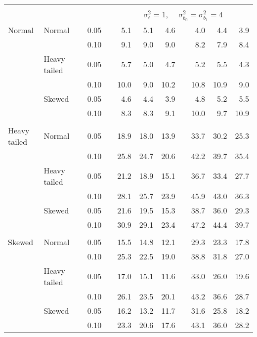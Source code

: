 \begin{table}[ht]
\begin{scriptsize}
\begin{tabular}{ll p{.1cm} c p{.1cm} rrr p{.1cm} rrr}
&&&&&&&&&&&\\
& && && \multicolumn{7}{c}{$\sigma_{\varepsilon}^2 = 1$, \ \ $\sigma_{b_0}^2 = \sigma_{b_1}^2 = 4$} \\ \cline{6-12}
\rowcolor{gray!20} Normal & Normal &  & 0.05 &  & 5.1 & 5.1 & 4.6 &  & 4.0 & 4.4 & 3.9 \\ 
\rowcolor{gray!20}    &  &  & 0.10 &  & 9.1 & 9.0 & 9.0 &  & 8.2 & 7.9 & 8.4 \\ 
\rowcolor{gray!20}    & Heavy tailed &  & 0.05 &  & 5.7 & 5.0 & 4.7 &  & 5.2 & 5.5 & 4.3 \\ 
\rowcolor{gray!20}    &  &  & 0.10 &  & 10.0 & 9.0 & 10.2 &  & 10.8 & 10.9 & 9.0 \\ 
\rowcolor{gray!20}    & Skewed &  & 0.05 &  & 4.6 & 4.4 & 3.9 &  & 4.8 & 5.2 & 5.5 \\ 
\rowcolor{gray!20}    &  &  & 0.10 &  & 8.3 & 8.3 & 9.1 &  & 10.0 & 9.7 & 10.9 \\ 
&&&&&&&&&&&\\
  Heavy tailed & Normal &  & 0.05 &  & 18.9 & 18.0 & 13.9 &  & 33.7 & 30.2 & 25.3 \\ 
   &  &  & 0.10 &  & 25.8 & 24.7 & 20.6 &  & 42.2 & 39.7 & 35.4 \\ 
   & Heavy tailed &  & 0.05 &  & 21.2 & 18.9 & 15.1 &  & 36.7 & 33.4 & 27.7 \\ 
   &  &  & 0.10 &  & 28.1 & 25.7 & 23.9 &  & 45.9 & 43.0 & 36.3 \\ 
   & Skewed &  & 0.05 &  & 21.6 & 19.5 & 15.3 &  & 38.7 & 36.0 & 29.3 \\ 
   &  &  & 0.10 &  & 30.9 & 29.1 & 23.4 &  & 47.2 & 44.4 & 39.7 \\ 
&&&&&&&&&&&\\
  Skewed & Normal &  & 0.05 &  & 15.5 & 14.8 & 12.1 &  & 29.3 & 23.3 & 17.8 \\ 
   &  &  & 0.10 &  & 25.3 & 22.5 & 19.0 &  & 38.8 & 31.8 & 27.0 \\ 
   & Heavy tailed &  & 0.05 &  & 17.0 & 15.1 & 11.6 &  & 33.0 & 26.0 & 19.6 \\ 
   &  &  & 0.10 &  & 26.1 & 23.5 & 20.1 &  & 43.2 & 36.6 & 28.7 \\ 
   & Skewed &  & 0.05 &  & 16.2 & 13.2 & 11.7 &  & 31.6 & 25.8 & 18.2 \\ 
   &  &  & 0.10 &  & 23.3 & 20.6 & 17.6 &  & 43.1 & 36.0 & 28.2 \\ 

\hline
\end{tabular}
\end{scriptsize}
\end{table}



